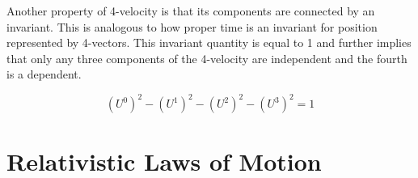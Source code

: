 \documentclass[12pt]{article}
\numberwithin{equation}{section}
\theoremstyle{plain}
\theoremstyle{definition}
\begin{document}
Another property of 4-velocity is that its components are connected by an invariant. This is analogous to how proper time is an invariant for position represented by 4-vectors. This invariant quantity is equal to 1 and further implies that only any three components of the 4-velocity are independent and the fourth is a dependent.

\begin{equation}
    (U^0)^2 - (U^1)^2 - (U^2)^2 - (U^3)^2 = 1
    \label{eq:4vel-invariant}
\end{equation}



\section{Relativistic Laws of Motion}
\end{document}
